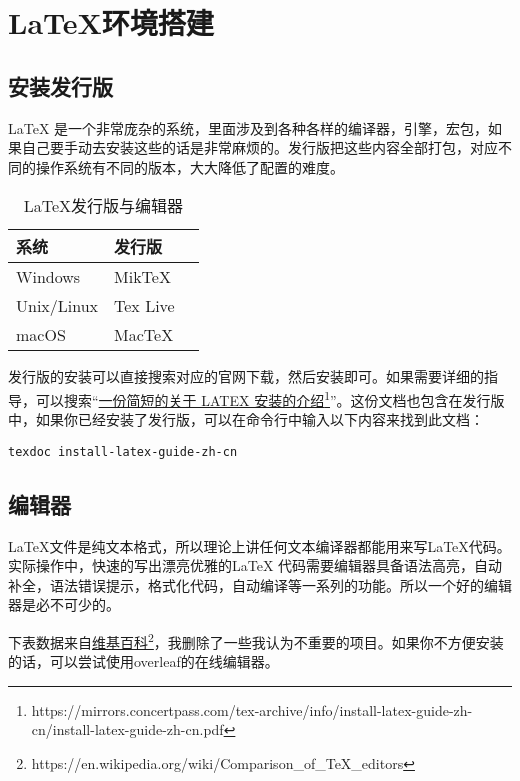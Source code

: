 \chapter{\LaTeX 环境搭建}
\section{安装发行版}
\LaTeX
是一个非常庞杂的系统，里面涉及到各种各样的编译器，引擎，宏包，如果自己要手动去安装这些的话是非常麻烦的。发行版把这些内容全部打包，对应不同的操作系统有不同的版本，大大降低了配置的难度。
\begin{table}[htpb]
	\centering
	\begin{tabular}{ lll } \toprule
		系统         & 发行版      \\          \midrule
		Windows    & MikTeX   \\
		Unix/Linux & Tex Live \\
		macOS      & MacTeX   \\\bottomrule
	\end{tabular}
	\caption{\LaTeX 发行版与编辑器}
\end{table}

发行版的安装可以直接搜索对应的官网下载，然后安装即可。如果需要详细的指导，可以搜索``\href{https://mirrors.concertpass.com/tex-archive/info/install-latex-guide-zh-cn/install-latex-guide-zh-cn.pdf}{一份简短的关于 LATEX
	安装的介绍}\footnote{https://mirrors.concertpass.com/tex-archive/info/install-latex-guide-zh-cn/install-latex-guide-zh-cn.pdf}''。这份文档也包含在发行版中，如果你已经安装了发行版，可以在命令行中输入以下内容来找到此文档：
\begin{tcolorbox}[title=CMD]
	\begin{verbatim}
texdoc install-latex-guide-zh-cn
\end{verbatim}
\end{tcolorbox}

\section{编辑器}
\LaTeX 文件是纯文本格式，所以理论上讲任何文本编译器都能用来写\LaTeX 代码。实际操作中，快速的写出漂亮优雅的\LaTeX
代码需要编辑器具备语法高亮，自动补全，语法错误提示，格式化代码，自动编译等一系列的功能。所以一个好的编辑器是必不可少的。

下表数据来自\href{https://en.wikipedia.org/wiki/Comparison_of_TeX_editors}{维基百科}\footnote{https://en.wikipedia.org/wiki/Comparison\_of\_TeX\_editors}，我删除了一些我认为不重要的项目。如果你不方便安装的话，可以尝试使用overleaf的在线编辑器。

